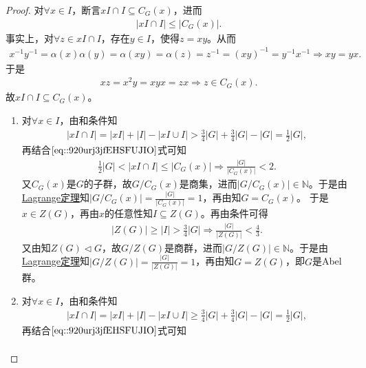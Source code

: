 \documentclass[../../main.tex]{subfiles}%
\begin{document}
\begin{proof}
对$\forall x\in I$，断言$xI\cap I\subseteq C_G(x)$，进而
\begin{align}
|xI\cap I|\leqslant |C_G(x)|.
\label{eq::920urj3jfEHSFUJIO}
\end{align}
事实上，对$\forall z\in xI\cap I$，存在$y\in I$，使得$z=xy$。从而
\begin{align*}
x^{-1}y^{-1}=\alpha(x)\alpha(y)=\alpha(xy)=\alpha(z)=z^{-1}=(xy)^{-1}=y^{-1}x^{-1}\Longrightarrow xy=yx.
\end{align*}
于是
\begin{align*}
xz=x^2y=xyx=zx\Longrightarrow z\in C_G(x).
\end{align*}
故$xI\cap I\subseteq C_G(x)$。
\begin{enumerate}[(1)]
\item 对$\forall x\in I$，由和条件知
\begin{align*}
|xI\cap I|=|xI|+|I|-|xI\cup I|>\frac{3}{4}|G|+\frac{3}{4}|G|-|G|=\frac{1}{2}|G|,
\end{align*}
再结合$\eqref{eq::920urj3jfEHSFUJIO}$式可知
\begin{align*}
\frac{1}{2}|G|<|xI\cap I|\leqslant |C_G(x)|\Longrightarrow \frac{|G|}{|C_G(x)|}<2.
\end{align*}
又$C_G(x)$是$G$的子群，故$G/C_G(x)$是商集，进而$|G/C_G(x)|\in \mathbb{N}$。于是由\hyperref[theorem:抽象代数--Lagrange定理]{Lagrange定理}知$|G/C_G(x)|=\frac{|G|}{|C_G(x)|}=1$，再由知$G=C_G(x)$。
于是$x\in Z(G)$，再由$x$的任意性知$I\subseteq Z(G)$。再由条件可得
\begin{align*}
|Z(G)|\geqslant |I|>\frac{3}{4}|G|\Longrightarrow \frac{|G|}{|Z(G)|}<\frac{4}{3}.
\end{align*}
又由知$Z(G)\lhd G$，故$G/Z(G)$是商群，进而$|G/Z(G)|\in \mathbb{N}$。于是由\hyperref[theorem:抽象代数--Lagrange定理]{Lagrange定理}知$|G/Z(G)|=\frac{|G|}{|Z(G)|}=1$，再由知$G=Z(G)$，即$G$是Abel群。
\item 对$\forall x\in I$，由和条件知
\begin{align*}
|xI\cap I|=|xI|+|I|-|xI\cup I|\geqslant \frac{3}{4}|G|+\frac{3}{4}|G|-|G|=\frac{1}{2}|G|,
\end{align*}
再结合$\eqref{eq::920urj3jfEHSFUJIO}$式可知
\begin{align}

\end{align}
\end{enumerate}
\end{proof}
\end{document}
